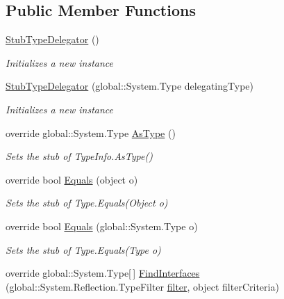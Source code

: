 \subsection*{Public Member Functions}
\begin{DoxyCompactItemize}
\item 
\hyperlink{class_system_1_1_reflection_1_1_fakes_1_1_stub_type_delegator_ac0ac84e25d7976189674addd2efa883c}{Stub\-Type\-Delegator} ()
\begin{DoxyCompactList}\small\item\em Initializes a new instance\end{DoxyCompactList}\item 
\hyperlink{class_system_1_1_reflection_1_1_fakes_1_1_stub_type_delegator_a90328cf920ece79b9c0507017f348a75}{Stub\-Type\-Delegator} (global\-::\-System.\-Type delegating\-Type)
\begin{DoxyCompactList}\small\item\em Initializes a new instance\end{DoxyCompactList}\item 
override global\-::\-System.\-Type \hyperlink{class_system_1_1_reflection_1_1_fakes_1_1_stub_type_delegator_a1cd1aca0e07dcbc66dc0d440beb6a980}{As\-Type} ()
\begin{DoxyCompactList}\small\item\em Sets the stub of Type\-Info.\-As\-Type()\end{DoxyCompactList}\item 
override bool \hyperlink{class_system_1_1_reflection_1_1_fakes_1_1_stub_type_delegator_a3476f83583363343e77e9c549bb2515b}{Equals} (object o)
\begin{DoxyCompactList}\small\item\em Sets the stub of Type.\-Equals(\-Object o)\end{DoxyCompactList}\item 
override bool \hyperlink{class_system_1_1_reflection_1_1_fakes_1_1_stub_type_delegator_a012188ee31aca9a767c1ba712d3a4df6}{Equals} (global\-::\-System.\-Type o)
\begin{DoxyCompactList}\small\item\em Sets the stub of Type.\-Equals(\-Type o)\end{DoxyCompactList}\item 
override global\-::\-System.\-Type\mbox{[}$\,$\mbox{]} \hyperlink{class_system_1_1_reflection_1_1_fakes_1_1_stub_type_delegator_ac6b31d8f4284a0f6ff26abf2d8fac6d1}{Find\-Interfaces} (global\-::\-System.\-Reflection.\-Type\-Filter \hyperlink{jquery-1_810_82-vsdoc_8js_ac99d0cf56cab46114f5765a14e03ad6d}{filter}, object filter\-Criteria)

\end{DoxyCompactItemize}
